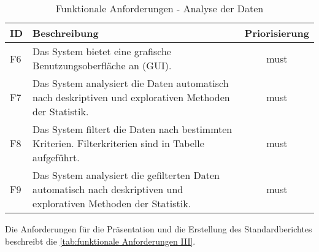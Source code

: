\begingroup
\setlength{\tabcolsep}{10pt} %
\renewcommand{\arraystretch}{1.25} 
\begin{table}[h]
    \centering
    \begin{adjustbox}{max width=\textwidth}
    \begin{tabular}{lp{13cm}c}
       \toprule
       \textbf{ID}          & \textbf{Beschreibung} &\textbf{Priorisierung}\\
       \midrule
        F6                               &Das System bietet eine grafische Benutzungsoberfläche an (GUI).  & must\\
        F7                               &Das System analysiert die Daten automatisch nach deskriptiven und explorativen Methoden der Statistik.  & must\\
        F8                               &Das System filtert die Daten nach bestimmten Kriterien. Filterkriterien sind in Tabelle aufgeführt. & must\\
        F9                              &Das System analysiert die gefilterten Daten automatisch nach deskriptiven und explorativen Methoden der Statistik. & must\\
        \bottomrule
    \end{tabular}
    \end{adjustbox}
    \caption{%
        Funktionale Anforderungen - Analyse der Daten
    }
    \label{tab:funktionale Anforderungen II}
    \end{table}
\endgroup

Die Anforderungen für die Präsentation und die Erstellung des Standardberichtes beschreibt die \autoref{tab:funktionale Anforderungen III}.

